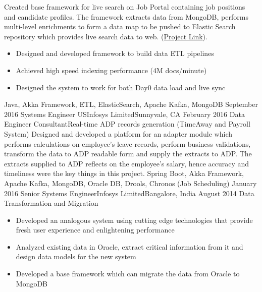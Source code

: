 \begin{experiences}
                    {
                      Created base framework for live search on Job Portal containing job positions and candidate profiles. The
framework extracts data from MongoDB, performs multi-level enrichments to form a data map to be pushed to Elastic Search repository which provides live search data to web. (\href{https://jobs.apple.com/en-us/search}{Project Link}).
                      \begin{itemize}
                        \item Designed and developed framework to build data ETL pipelines
                        \item Achieved high speed indexing performance (4M docs/minute)            
                        \item Designed the system to work for both Day0 data load and live sync                    
                      \end{itemize}
                    }
                    {Java, Akka Framework, ETL, ElasticSearch, Apache Kafka, MongoDB}
  \emptySeparator
  \consultantexperience
  {September 2016}      {Systems Engineer US}{Infosys Limited}{Sunnyvale, CA}
  {February 2016}       {Data Engineer Consultant}{Real-time ADP records generation (TimeAway and Payroll System)}
                    {
                      Designed and developed a platform for an adapter module which performs calculations on employee’s leave
records, perform business validations, transform the data to ADP readable form and supply the extracts to ADP.
The extracts supplied to ADP reflects on the employee’s salary, hence accuracy and timeliness were the key
things in this project. 
                    }
                    {Spring Boot, Akka Framework, Apache Kafka, MongoDB, Oracle DB, Drools, Chronos (Job Scheduling)} 
  \emptySeparator   
   \consultantexperience
    {January 2016}   {Senior Systems Engineer}{Infosys Limited}{Bangalore, India}
    {August 2014} {} {Data Transformation and Migration}
    {
                      \begin{itemize}
                        \item Developed an analogous
system using cutting edge technologies that provide fresh user experience and enlightening performance
                        \item Analyzed existing data in Oracle, extract critical information from it and design data models for the new system
                        \item Developed a base framework which can migrate the data from Oracle to MongoDB

\end{itemize}}
\end{experiences}
